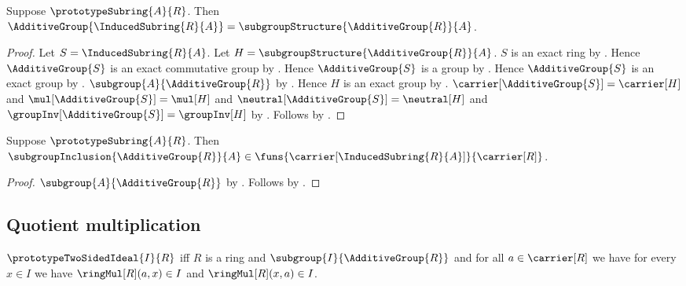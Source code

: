 \begin{theorem}\label{spike_induced_subring_additive_reduct}
    Suppose $\prototypeSubring{A}{R}$.
    Then
        $\AdditiveGroup{\InducedSubring{R}{A}}
            =\subgroupStructure{\AdditiveGroup{R}}{A}$.
\end{theorem}
\begin{proof}
    Let $S=\InducedSubring{R}{A}$.
    Let $H=\subgroupStructure{\AdditiveGroup{R}}{A}$.
    $S$ is an exact ring by .
    Hence $\AdditiveGroup{S}$ is an exact commutative group by
        .
    Hence $\AdditiveGroup{S}$ is a group by
        .
    Hence $\AdditiveGroup{S}$ is an exact group by
        .
    $\subgroup{A}{\AdditiveGroup{R}}$ by
        .
    Hence $H$ is an exact group by
        .
    $\carrier[\AdditiveGroup{S}]=\carrier[H]$ and
        $\mul[\AdditiveGroup{S}]=\mul[H]$ and
        $\neutral[\AdditiveGroup{S}]=\neutral[H]$ and
        $\groupInv[\AdditiveGroup{S}]=\groupInv[H]$ by
        .
    Follows by .
\end{proof}

\begin{proposition}\label{spike_induced_subring_inclusion_reused}
    Suppose $\prototypeSubring{A}{R}$.
    Then
        $\subgroupInclusion{\AdditiveGroup{R}}{A}
            \in\funs{\carrier[\InducedSubring{R}{A}]}{\carrier[R]}$.
\end{proposition}
\begin{proof}
    $\subgroup{A}{\AdditiveGroup{R}}$ by
        .
    Follows by
        .
\end{proof}

\subsection{Quotient multiplication}

\begin{definition}\label{spike_prototype_two_sided_ideal}
    $\prototypeTwoSidedIdeal{I}{R}$ iff
        $R$ is a ring and
        $\subgroup{I}{\AdditiveGroup{R}}$ and
        for all $a\in\carrier[R]$ we have for every $x\in I$ we have
            $\ringMul[R](a,x)\in I$ and $\ringMul[R](x,a)\in I$.
\end{definition}

